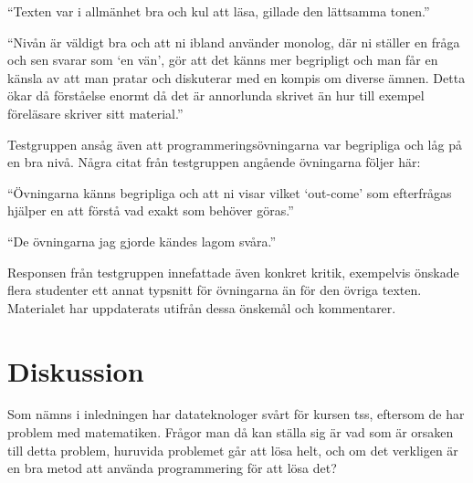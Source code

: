 \documentclass[12pt,a4paper,twoside,openright]{article}
\begin{document}
\begin{displayquote}
  ``Texten var i allmänhet bra och kul att läsa, gillade den
  lättsamma tonen.''
\end{displayquote}

\begin{displayquote}
  ``Nivån är väldigt bra och att ni ibland använder monolog, där
  ni ställer en fråga och sen svarar som `en vän', gör att det känns
  mer begripligt och man får en känsla av att man pratar och
  diskuterar med en kompis om diverse ämnen. Detta ökar då förståelse
  enormt då det är annorlunda skrivet än hur till exempel föreläsare
  skriver sitt material.''
\end{displayquote}

Testgruppen ansåg även att programmeringsövningarna var begripliga och
låg på en bra nivå. Några citat från testgruppen angående övningarna
följer här:

\begin{displayquote}
  ``Övningarna känns begripliga och att ni visar vilket `out-come'
  som efterfrågas hjälper en att förstå vad exakt som behöver göras.''
\end{displayquote}

\begin{displayquote}
  ``De övningarna jag gjorde kändes lagom svåra.''
\end{displayquote}

Responsen från testgruppen innefattade även konkret kritik, exempelvis
önskade flera studenter ett annat typsnitt för övningarna än för den
övriga texten. Materialet har uppdaterats utifrån dessa önskemål och
kommentarer.

\newpage

\section{Diskussion}



Som nämns i inledningen har datateknologer svårt för kursen
\gls{tss}, eftersom de har problem med matematiken. Frågor man då
kan ställa sig är vad som är orsaken till detta problem, huruvida
problemet går att lösa helt, och om det verkligen är en bra metod att
använda programmering för att lösa det?
\end{document}

